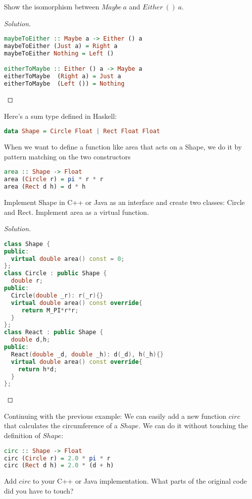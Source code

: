 \documentclass[7x10,thmnumcontwithchapter,WebLink,AddlevelTwoTOC,NumRef,BookEndNote,printer]{pupbook}
\begin{document}
\begin{exercise}
Show the isomorphism between $Maybe \ a$ and $Either \ () \ a$.
\end{exercise}

\begin{proof}[Solution]
~\\	
\begin{lstlisting}[language=Haskell]
maybeToEither :: Maybe a -> Either () a
maybeToEither (Just a) = Right a
maybeToEither Nothing = Left ()

eitherToMaybe :: Either () a -> Maybe a
eitherToMaybe  (Right a) = Just a
eitherToMaybe  (Left ()) = Nothing
\end{lstlisting}
\end{proof}


\begin{exercise}
Here’s a sum type defined in Haskell: 
\begin{lstlisting}[language=Haskell]
data Shape = Circle Float | Rect Float Float
\end{lstlisting}
When we want to define a function like area that acts on a Shape,
we do it by pattern matching on the two constructors
\begin{lstlisting}[language=Haskell]
area :: Shape -> Float
area (Circle r) = pi * r * r
area (Rect d h) = d * h
\end{lstlisting}
Implement Shape in C++ or Java as an interface and create two
classes: Circle and Rect. Implement area as a virtual function.
\end{exercise}

\begin{proof}[Solution]
~\\
\begin{lstlisting}[language=C++]
class Shape {
public:
  virtual double area() const = 0;
};
class Circle : public Shape {
  double r;
public:
  Circle(double _r): r(_r){}
  virtual double area() const override{
     return M_PI*r*r;
  }
};
class React : public Shape { 
  double d,h;
public:
  React(double _d, double _h): d(_d), h(_h){}
  virtual double area() const override{
    return h*d;
  }
};
\end{lstlisting}
\end{proof}


\begin{exercise}
Continuing with the previous example: We can easily add a new
function $circ$ that calculates the circumference of a $Shape$. We
can do it without touching the definition of $Shape$:
\begin{lstlisting}[language=Haskell]
circ :: Shape -> Float
circ (Circle r) = 2.0 * pi * r
circ (Rect d h) = 2.0 * (d + h)
\end{lstlisting}
Add $circ$ to your C++ or Java implementation. What parts of the
original code did you have to touch?
\end{exercise}
\end{document}

